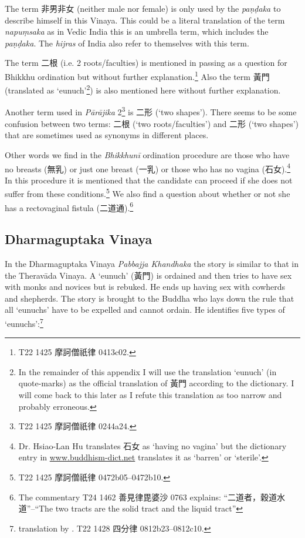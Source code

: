 The term 非男非女 (neither male nor female) is only used by the {\em paṇḍaka} to describe himself in this Vinaya. This could be a literal translation of the term {\em napuṃsaka} as in Vedic India this is an umbrella term, which includes the {\em paṇḍaka}. The {\em hijras} of India also refer to themselves with this term.

The term 二根 (i.e. 2 roots/faculties) is mentioned in passing as a question for Bhikkhu ordination but without further explanation.\footnote{T22 1425 摩訶僧祇律 0413c02.} Also the term 黃門 (translated as `eunuch'\footnote{In the remainder of this appendix I will use the translation `eunuch' (in quote-marks) as the official translation of 黃門 according to the dictionary. I will come back to this later as I refute this translation as too narrow and probably erroneous.}) is also mentioned here without further explanation.

Another term used in {\em Pārājika} 2\footnote{T22 1425 摩訶僧祇律 0244a24.} is 二形 (`two shapes'). There seems to be some confusion between two terms: 二根 (`two roots/faculties') and 二形 (`two shapes') that are sometimes used as synonyms in different places.

Other words we find in the {\em Bhikkhunī} ordination procedure are those who have no breasts (無乳) or just one breast (一乳) or those who has no vagina (石女).\footnote{Dr. Hsiao-Lan Hu translates 石女 as `having no vagina' but the dictionary entry in \href{http://www.buddhism-dict.net/cgi-bin/xpr-ddb.pl?q=石女}{www.buddhism-dict.net} translates it as `barren' or `sterile'.} In this procedure it is mentioned that the candidate can proceed if she does not suffer from these conditions.\footnote{T22 1425 摩訶僧祇律 0472b05–0472b10.} We also find a question about whether or not she has a rectovaginal fistula (二道通).\footnote{The commentary T24 1462 善見律毘婆沙 0763 explains: ``二道者，穀道水道''--``The two tracts are the solid tract and the liquid tract''}

\subsection{Dharmaguptaka Vinaya}
In the Dharmaguptaka Vinaya {\em Pabbajja Khandhaka} the story is similar to that in the Theravāda Vinaya. A `eunuch' (黃門) is ordained and then tries to have sex with monks and novices but is rebuked. He ends up having sex with cowherds and shepherds. The story is brought to the Buddha who lays down the rule that all `eunuchs' have to be expelled and cannot ordain. He identifies five types of `eunuchs':\footnote{translation by \cite{bodhi}. T22 1428 四分律 0812b23–0812c10.} 

